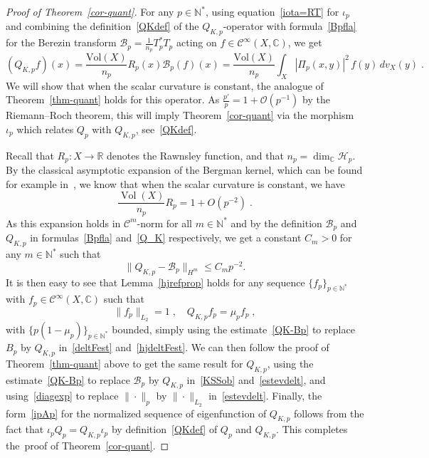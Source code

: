 \documentclass[11pt]{article}
\theoremstyle{definition}
\numberwithin{equation}{section}
\numberwithin{figure}{section}
\numberwithin{table}{section}
\DeclareMathOperator{\Vol}{Vol}
\let\cal\mathscr
\newcommand{\R}{{\mathbb{R}}}
\newcommand{\N}{{\mathbb{N}}}
\newcommand{\CCC}{{\mathbb{C}}}
\newcommand{\CC}{\mathcal{C}}
\newcommand{\cB}{{\mathcal{B}}}
\newcommand{\bigo}{\mathcal{O}}
\renewcommand\leq {\leqslant}
\newcommand\< {\mathcal{h}}
\renewcommand\> {\mathcal{i}}
\newcommand{\cinf}{\CC^\infty}
\newcommand\HH {{\cal H}}
\newcommand*\cC{\mathscr{C}}
\begin{document}
\begin{proof}[Proof of Theorem~\ref{cor-quant}]
For any $p\in\N^*$, using equation~\eqref{iota=RT} for $\iota_p$ and combining the definition~\eqref{QKdef} of the $Q_{K,p}$-operator with formula~\eqref{Bpfla} for the Berezin transform $\cB_p= \frac{1}{n_p} T^*_p T_p$ acting on $f\in\cinf(X,\CCC)$, we get
\begin{equation}\label{Q_K}
(Q_{K,p} f)(x)= \frac{\text{Vol}(X)}{n_p} R_p(x) \cB_p(f)(x) = \frac{\text{Vol}(X)}{n_p}
\int_X |\Pi_p(x,y)|^2\,f(y)\,dv_X(y)\;.
\end{equation}
We will show that when the scalar curvature is constant, the analogue of Theorem~\ref{thm-quant} holds for this operator. As $\frac{p'}{p} = 1 + \bigo(p^{-1})$ by the Riemann--Roch theorem, this will imply Theorem~\ref{cor-quant} via the morphism $\iota_p$ which relates $Q_p$ with $Q_{K,p}$, see~\eqref{QKdef}.

Recall that $R_p:X\to\R$ denotes the Rawnsley function, and that $n_p=\dim_\CCC\HH_p$. By the classical asymptotic expansion of the Bergman kernel, which can be found for example in~\cite[Section~4.1.1]{MM07}, we know that when the scalar curvature is constant, we have
\begin{equation}
\frac{\Vol(X)}{n_p}R_p=1+O\left(p^{-2}\right)\;.
\end{equation}
As this expansion holds in $\cC^m$-norm for all $m\in\N^*$ and by the definition $\cB_p$ and $Q_{K,p}$ in formulas~\eqref{Bpfla} and~\eqref{Q_K} respectively, we get a constant $C_m>0$ for any $m\in\N^*$ such that
\begin{equation}\label{QK-Bp}
\|Q_{K,p}-\cB_p\|_{H^m}\leq C_m p^{-2}.
\end{equation}
It is then easy to see that Lemma~\ref{hjrefprop} holds for any sequence $\{f_p\}_{p\in\N^*}$ with $f_p\in\cinf(X,\CCC)$ such that
\begin{equation}\label{efQKp}
\|f_p\|_{L_2}=1\;,\quad Q_{K,p}f_p=\mu_p f_p\;,
\end{equation}
with $\{p(1-\mu_p)\}_{p\in\N^*}$ bounded, simply using the estimate~\eqref{QK-Bp} to replace $B_p$ by $Q_{K,p}$ in~\eqref{deltFest} and~\eqref{hjdeltFest}. We can then follow the proof of Theorem~\ref{thm-quant} above to get the same result for $Q_{K,p}$, using the estimate~\eqref{QK-Bp} to replace $\cB_p$ by $Q_{K,p}$ in~\eqref{KSSob} and~\eqref{estevdelt}, and using~\eqref{diagexp} to replace $\|\cdot\|_p$ by $\|\cdot\|_{L_2}$ in~\eqref{estevdelt}. Finally, the form~\eqref{ipAp} for the normalized sequence of eigenfunction of $Q_{K,p}$ follows from the fact that $\iota_pQ_p = Q_{K,p}\iota_p$ by definition~\eqref{QKdef} of $Q_p$ and $Q_{K,p}$. This completes the~proof of Theorem~\ref{cor-quant}.
\end{proof}
\end{document}
